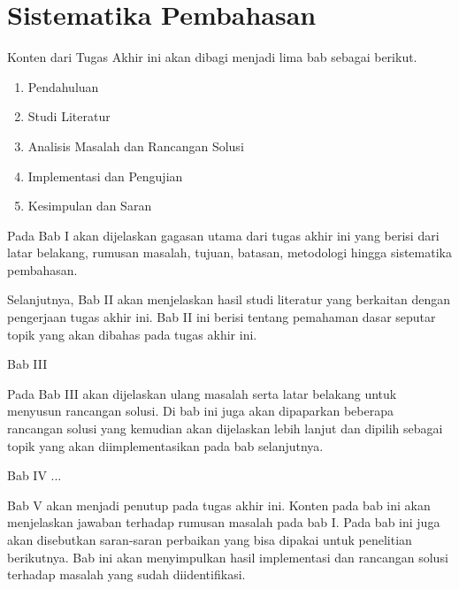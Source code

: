 \section{Sistematika Pembahasan}

Konten dari Tugas Akhir ini akan dibagi menjadi lima bab sebagai berikut.
\begin{enumerate}
    \item Pendahuluan
    \item Studi Literatur
    \item Analisis Masalah dan Rancangan Solusi
    \item Implementasi dan Pengujian
    \item Kesimpulan dan Saran
\end{enumerate}

Pada Bab I akan dijelaskan gagasan utama dari tugas akhir ini yang berisi dari latar belakang, rumusan masalah, tujuan, batasan, metodologi hingga sistematika pembahasan.

Selanjutnya, Bab II akan menjelaskan hasil studi literatur yang berkaitan dengan pengerjaan tugas akhir ini. Bab II ini berisi tentang pemahaman dasar seputar topik yang akan dibahas pada tugas akhir ini.

Bab III 

Pada Bab III akan dijelaskan ulang masalah serta latar belakang untuk menyusun rancangan solusi. Di bab ini juga akan dipaparkan beberapa rancangan solusi yang kemudian akan dijelaskan lebih lanjut dan dipilih sebagai topik yang akan diimplementasikan pada bab selanjutnya.

Bab IV ...

Bab V akan menjadi penutup pada tugas akhir ini. Konten pada bab ini akan menjelaskan jawaban terhadap rumusan masalah pada bab I. Pada bab ini juga akan disebutkan saran-saran perbaikan yang bisa dipakai untuk penelitian berikutnya. Bab ini akan menyimpulkan hasil implementasi dan rancangan solusi terhadap masalah yang sudah diidentifikasi.
